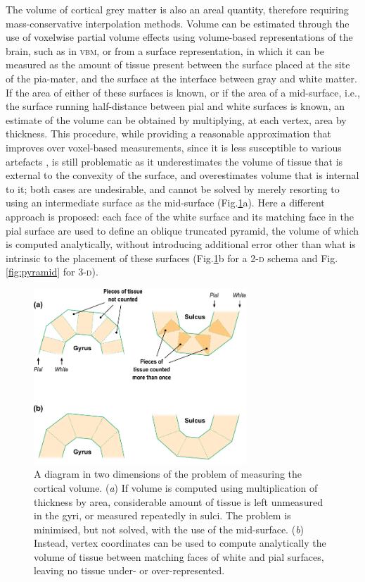 The volume of cortical grey matter is also an areal quantity, therefore requiring mass-conservative interpolation methods. Volume can be estimated through the use of voxelwise partial volume effects using volume-based representations of the brain, such as in \textsc{vbm}, or from a surface representation, in which it can be measured as the amount of tissue present between the surface placed at the site of the pia-mater, and the surface at the interface between gray and white matter. If the area of either of these surfaces is known, or if the area of a mid-surface, i.e., the surface running half-distance between pial and white surfaces \citep{vanEssen2005} is known, an estimate of the volume can be obtained by multiplying, at each vertex, area by thickness. This procedure, while providing a reasonable approximation that improves over voxel-based measurements, since it is less susceptible to various artefacts \cite[for a discussion of artefacts in \textsc{vbm}, see][]{Ashburner2009}, is still problematic as it underestimates the volume of tissue that is external to the convexity of the surface, and overestimates volume that is internal to it; both cases are undesirable, and cannot be solved by merely resorting to using an intermediate surface as the mid-surface (Fig.\ref{fig:mantle}a). Here a different approach is proposed: each face of the white surface and its matching face in the pial surface are used to define an oblique truncated pyramid, the volume of which is computed analytically, without introducing additional error other than what is intrinsic to the placement of these surfaces (Fig.\ref{fig:mantle}b for a 2-\textsc{d} schema and Fig.\ref{fig:pyramid} for 3-\textsc{d}).

\begin{figure}%
\begin{center}
\includegraphics[width=8cm]{figures/mantle.pdf}
\caption{A diagram in two dimensions of the problem of measuring the cortical volume. (\emph{a}) If volume is computed using multiplication of thickness by area, considerable amount of tissue is left unmeasured in the gyri, or measured repeatedly in sulci. The problem is minimised, but not solved, with the use of the mid-surface. (\emph{b}) Instead, vertex coordinates can be used to compute analytically the volume of tissue between matching faces of white and pial surfaces, leaving no tissue under- or over-represented.}
\label{fig:mantle} 
\end{center}
\end{figure}

